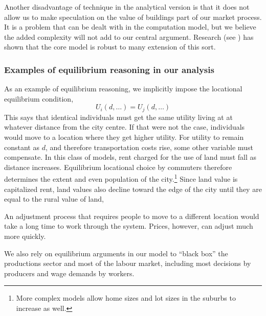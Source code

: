 {Another disadvantage of technique in the analytical version is that it does not allow us to make speculation on  the value of  buildings part of our market process. It is a problem that can be dealt with in the computation model, but we believe the added complexity will not add to our central argument. Research (see \cite{mcdonaldWilliamAlonsoRichard2007}) has shown  that the core model is robust to many extension of this sort. 

\subsubsection{Examples of  \gls{equilibrium} reasoning in our analysis}
As an example of \gls{equilibrium reasoning},  we implicitly impose the locational equilibrium condition,
\[U_i(d,\dots)=U_j(d, \dots)\]
This says that identical individuals must get the same utility living at at whatever distance from the city centre. If that were not the case, individuals would move to a location where they get higher utility. For utility to remain constant as $d$, and therefore transportation costs  rise, some other variable must compensate. In this class of models, rent charged for the use of land must fall as distance increases. Equilibrium locational choice by commuters therefore determines the extent and even population of the city.\footnote{More complex models allow home sizes and lot sizes in the suburbs to increase as well.} Since land value  is capitalized rent, land values also decline toward the edge of the city until they are equal to the rural value of land, 

An adjustment process that requires people to move to a different location would take a long time to work through the system. Prices, however, can adjust much more quickly.




We also rely on equilibrium arguments in our model to ``black box'' the productions sector and most of  the labour market, including most decisions by producers and wage demands by workers. 



}
